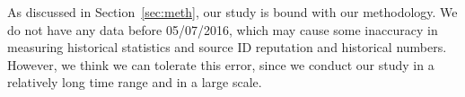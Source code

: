 As discussed in Section~\ref{sec:meth}, our study is bound with our methodology.
We do not have any data before 05/07/2016, 
which may cause some inaccuracy in measuring historical statistics and 
source ID reputation and historical numbers.
However, we think we can tolerate this error, 
since we conduct our study in a relatively long time range and in a large scale. 
